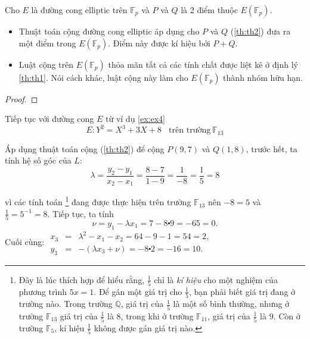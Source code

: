 \begin{theorem}
	\label{th:th3}
	Cho $E$ là đường cong elliptic trên $\mathbb{F}_p$ và $P$ và $Q$ là 2 điểm thuộc $E(\mathbb{F}_{p})$.
	\begin{itemize}
		\item Thuật toán cộng đường cong elliptic áp dụng cho $P$ và $Q$ (\ref{th:th2}) đưa ra một điểm trong $E(\mathbb{F}_{p})$.
		      Điểm này được kí hiệu bởi $P + Q$.
		\item Luật cộng trên $E(\mathbb{F}_{p})$ thỏa mãn tất cả các tính chất được liệt kê ở định lý \ref{th:th1}.
		      Nói cách khác, luật cộng này làm cho $E(\mathbb{F}_{p})$ thành nhóm hữu hạn.
	\end{itemize}
\end{theorem}

\begin{proof}

\end{proof}

\begin{example}
	\label{ex:ex5}
	Tiếp tục với đường cong $E$ từ ví dụ \ref{ex:ex4}
	$$ E: Y^2 = X^3 + 3X + 8 \ \ \ \ \text{trên trường}\  \mathbb{F}_{13} $$
\end{example}
Áp dụng thuật toán cộng (\ref{th:th2}) để cộng $P(9,7)$ và $Q(1,8)$, trước hết, ta tính hệ số góc của $L$:
$$\lambda  =\frac{y_2-y_1}{x_2-x_1} = \frac{8-7}{1-9} = \frac{1}{-8} = \frac{1}{5} = 8$$

vì các tính toán \footnote{Đây là lúc thích hợp để hiểu rằng, $\frac{1}{5}$ chỉ là \textit{kí hiệu} cho một nghiệm của phương trình $5x=1$.
	Để gán một giá trị cho $\frac{1}{5}$, bạn phải biết giá trị đang ở trường nào. Trong trường $\mathbb{Q}$, giá trị của $\frac{1}{5}$ là một số bình thường,
	nhưng ở trường $\mathbb{F}_{13}$ giá trị của $\frac{1}{5}$ là $8$, trong khi ở trường $\mathbb{F}_{11}$, giá trị của $\frac{1}{5}$ là $9$.
	Còn ở trường $\mathbb{F}_5$, kí hiệu $\frac{1}{5}$ không được gán giá trị nào.} đang được thực hiện trên trường $\mathbb{F}_{13}$ nên $-8 = 5$ và $\frac{1}{5} = 5^{-1} = 8$.
Tiếp tục, ta tính
$$\nu = y_1 - \lambda x_1 = 7 - 8 \centerdot 9 = -65 = 0.$$
Cuối cùng:
$
	\begin{array}{rcl}
		x_3 & = & \lambda^2 - x_1 - x_2 = 64 -9 -1 = 54 = 2,         \\
		y_3 & = & -(\lambda x_3 + \nu) = -8 \centerdot 2 = -16 = 10.
	\end{array}
$